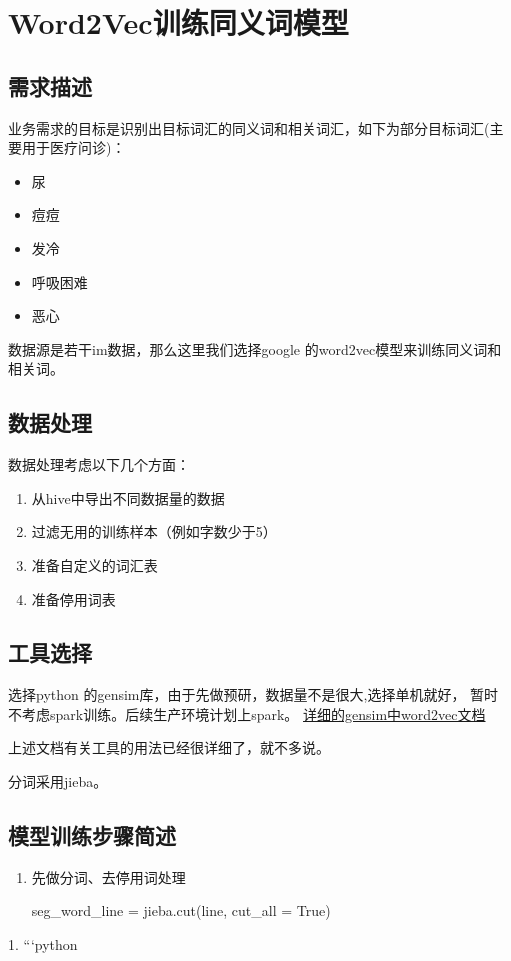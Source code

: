 \chapter{Word2Vec训练同义词模型}
\section{需求描述}
业务需求的目标是识别出目标词汇的同义词和相关词汇，如下为部分目标词汇(主要用于医疗问诊)：
\begin{itemize}
    \item 尿
    \item 痘痘
    \item 发冷
    \item 呼吸困难 
    \item 恶心
\end{itemize}

数据源是若干im数据，那么这里我们选择google 的word2vec模型来训练同义词和相关词。

\section{数据处理}

数据处理考虑以下几个方面：
\begin{enumerate}
    \item 从hive中导出不同数据量的数据
    \item 过滤无用的训练样本（例如字数少于5）
    \item 准备自定义的词汇表
    \item 准备停用词表
\end{enumerate}

\section{工具选择}

选择python 的gensim库，由于先做预研，数据量不是很大,选择单机就好，
暂时不考虑spark训练。后续生产环境计划上spark。
\href{https://radimrehurek.com/gensim/models/word2vec.html}{详细的gensim中word2vec文档}

上述文档有关工具的用法已经很详细了，就不多说。

分词采用jieba。

\section{模型训练步骤简述}
\begin{enumerate}
    \item 先做分词、去停用词处理
    \begin{python}
        seg_word_line = jieba.cut(line, cut_all = True)
    \end{python}
\end{enumerate}
1.
```python

